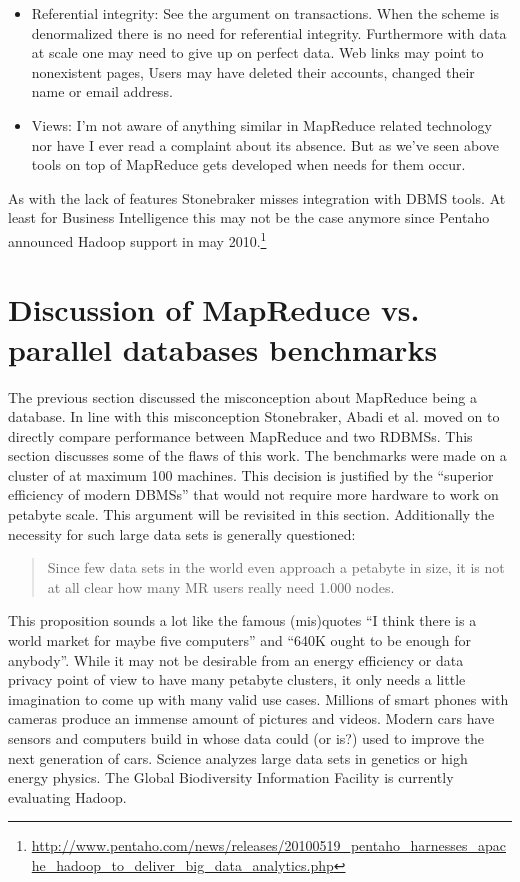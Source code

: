 \documentclass[12pt,a4paper]{scrartcl}		%
\begin{document}
\begin{itemize}
\item Referential integrity: See the argument on transactions. When the scheme is denormalized there is no need for referential integrity. Furthermore with data at scale one may need to give up on perfect data. Web links may point to nonexistent pages, Users may have deleted their accounts, changed their name or email address.
\item Views: I'm not aware of anything similar in MapReduce related technology nor have I ever read a complaint about its absence. But as we've seen above tools on top of MapReduce gets developed when needs for them occur.
\end{itemize}
As with the lack of features Stonebraker misses integration with DBMS tools. At least for Business Intelligence this may not be the case anymore since Pentaho announced Hadoop support in may 2010.\footnote{\url{http://www.pentaho.com/news/releases/20100519_pentaho_harnesses_apache_hadoop_to_deliver_big_data_analytics.php}}

\section{Discussion of MapReduce vs. parallel databases benchmarks}
The previous section discussed the misconception about MapReduce being a database. In line with this misconception Stonebraker, Abadi et al. moved on to directly compare performance between MapReduce and two RDBMSs.\cite{Pavlo09} This section discusses some of the flaws of this work.
The benchmarks were made on a cluster of at maximum 100 machines. This decision is justified by the ``superior efficiency of modern DBMSs'' that would not require more hardware to work on petabyte scale. This argument will be revisited in this section. Additionally the necessity for such large data sets is generally questioned:
\begin{quote}
  Since few data sets in the world even approach a petabyte in size, it is not at all clear how many MR users really need 1.000 nodes.
\end{quote}
This proposition sounds a lot like the famous (mis)quotes ``I think there is a world market for maybe five computers'' and ``640K ought to be enough for anybody''. While it may not be desirable from an energy efficiency or data privacy point of view to have many petabyte clusters, it only needs a little imagination to come up with many valid use cases. Millions of smart phones with cameras produce an immense amount of pictures and videos. Modern cars have sensors and computers build in whose data could (or is?) used to improve the next generation of cars. Science analyzes large data sets in genetics or high energy physics. The Global Biodiversity Information Facility is currently evaluating Hadoop.
\end{document}
